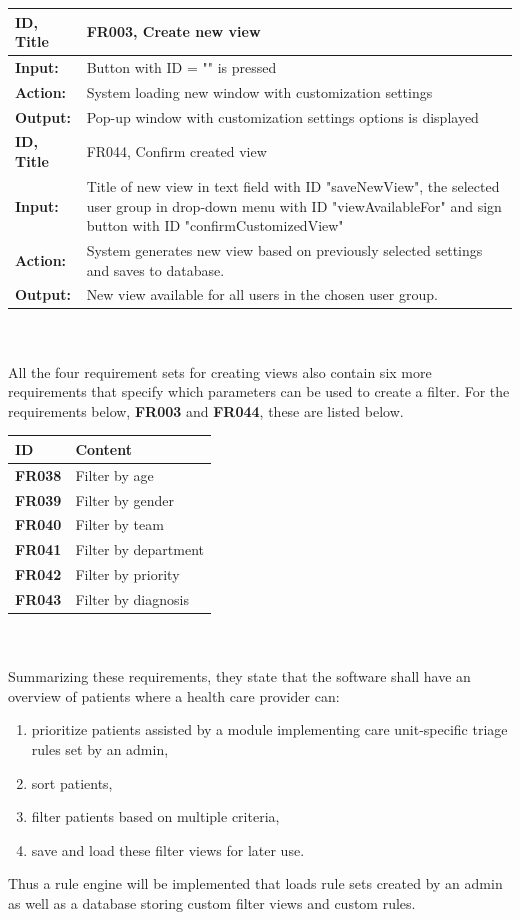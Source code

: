 \documentclass{article}
\begin{document}
\begin{tabularx}{\linewidth}{| l |  X |}
\hline
\textbf{ID, Title} & FR003, Create new view \\ 
\hline
\textbf{Input:} & Button with ID = "" is pressed \\
\textbf{Action:} & System loading new window with customization settings \\
\textbf{Output:} & Pop-up window with customization settings options is displayed \\
\hline

\textbf{ID, Title} & FR044, Confirm created view \\ 
\hline
\textbf{Input:} & Title of new view in text field with ID "saveNewView", the selected user group in drop-down menu with ID "viewAvailableFor" and sign button with ID "confirmCustomizedView" \\
\textbf{Action:} & System generates new view based on previously selected settings and saves to database. \\
\textbf{Output:} & New view available for all users in the chosen user group. \\
\hline
\end{tabularx}
\\ \\
All the four requirement sets for creating views also contain six more requirements that specify which parameters can be used to create a filter. For the requirements below, \textbf{FR003} and \textbf{FR044}, these are listed below.
\begin{table}[h]
\centering
\begin{tabular}{|l|l|}
\hline
ID & Content \\ \hline
\textbf{FR038} & Filter by age \\
\textbf{FR039} & Filter by gender \\
\textbf{FR040} & Filter by team \\
\textbf{FR041} & Filter by department \\
\textbf{FR042} & Filter by priority \\
\textbf{FR043} & Filter by diagnosis \\
\hline
\end{tabular}
\end{table}
\\ \\
Summarizing these requirements, they state that the software shall have an overview of patients where a health care provider can:
\begin{enumerate}[label=(\roman*)]
\item prioritize patients assisted by a module implementing care unit-specific triage rules set by an admin,
\item sort patients,
\item filter patients based on multiple criteria,
\item save and load these filter views for later use.
\end{enumerate}
Thus a rule engine will be implemented that loads rule sets created by an admin as well as a database storing custom filter views and custom rules.
\end{document}
